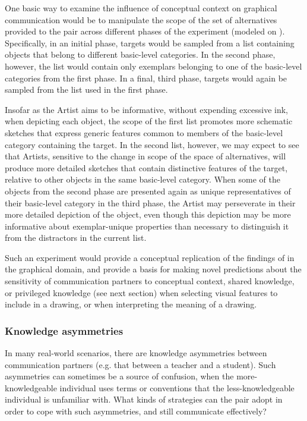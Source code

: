 \documentclass[12pt]{article}
\begin{document}
One basic way to examine the influence of conceptual context on graphical communication would be to manipulate the scope of the set of alternatives provided to the pair across different phases of the experiment (modeled on ). Specifically, in an initial phase, targets would be sampled from a list containing objects that belong to different basic-level categories. In the second phase, however, the list would contain only exemplars belonging to one of the basic-level categories from the first phase. In a final, third phase, targets would again be sampled from the list used in the first phase. 

Insofar as the Artist aims to be informative, without expending excessive ink, when depicting each object, the scope of the first list promotes more schematic sketches that express generic features common to members of the basic-level category containing the target. In the second list, however, we may expect to see that Artists, sensitive to the change in scope of the space of alternatives, will produce more detailed sketches that contain distinctive features of the target, relative to other objects in the same basic-level category. When some of the objects from the second phase are presented again as unique representatives of their basic-level category in the third phase, the Artist may perseverate in their more detailed depiction of the object, even though this depiction may be more informative about exemplar-unique properties than necessary to distinguish it from the distractors in the current list.

Such an experiment would provide a conceptual replication of the findings of  in the graphical domain, and provide a basis for making novel predictions about the sensitivity of communication partners to conceptual context, shared knowledge, or privileged knowledge (see next section) when selecting visual features to include in a drawing, or when interpreting the meaning of a drawing. 

\subsubsection{Knowledge asymmetries} In many real-world scenarios, there are knowledge asymmetries between communication partners (e.g. that between a teacher and a student). Such asymmetries can sometimes be a source of confusion, when the more-knowledgeable individual uses terms or conventions that the less-knowledgeable individual is unfamiliar with. What kinds of strategies can the pair adopt in order to cope with such asymmetries, and still communicate effectively? 
\end{document}
